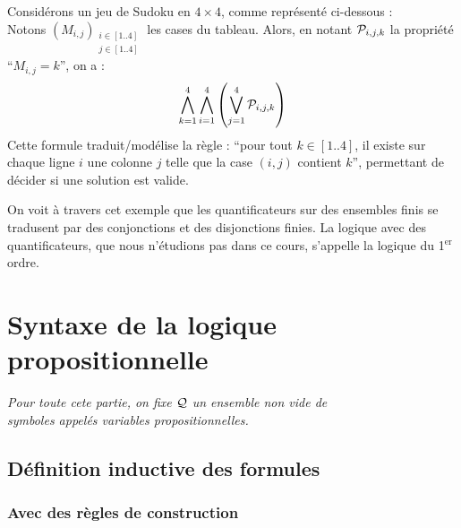 \eqskip{3mm}
\begin{Exemple}
	Considérons un jeu de Sudoku en \(4 \times 4\), comme représenté ci-dessous : \\
	Notons \((M_{i,j})_{\substack{\scriptscriptstyle i \in [1..4] \\[-0.2mm] \scriptscriptstyle j \in [1..4]}}\) les cases du tableau. Alors, en notant \( \cal{P}_{i,j,k} \) la propriété ``\(M_{i,j} = k\)'', on a : 
		\[\displaystyle \bigwedge_{k=1}^{4} \bigwedge_{i=1}^{4} \left( \bigvee_{j=1}^{4} \cal{P}_{i,j,k} \right)\]
	Cette formule traduit/modélise la règle : ``pour tout \(k \in [1..4]\), il existe sur chaque ligne \(i\) une colonne \(j\) telle que la case \((i,j)\) contient \(k\)'', permettant de décider si une solution est valide.
\end{Exemple}

\begin{Remarque}
	On voit à travers cet exemple que les quantificateurs sur des ensembles finis se tradusent par des conjonctions et des disjonctions finies. La logique avec des quantificateurs, que nous n'étudions pas dans ce cours, s'appelle la logique du 1$^{\text{er}}$ ordre.
\end{Remarque}

\section{Syntaxe de la logique propositionnelle}

	\begin{center}
		\textit{Pour toute cete partie, on fixe \(\cal{Q}\) un ensemble non vide de \\ symboles appelés variables propositionnelles.}
	\end{center}


	\subsection{Définition inductive des formules}
	
		\subsubsection{Avec des règles de construction}
			
